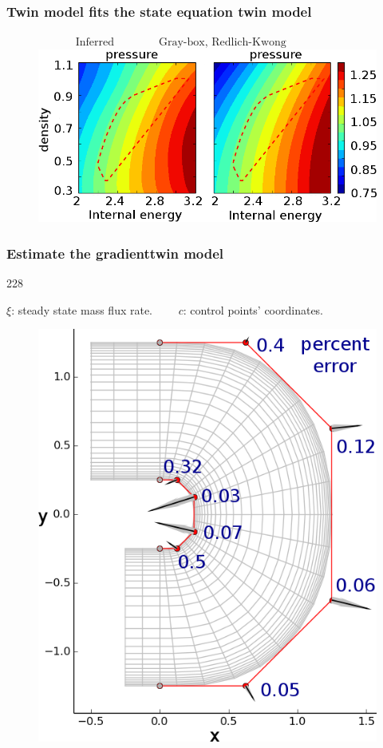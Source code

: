 \documentclass{beamer}
\newcommand{\barrow}{\item[\color{darkred}\ding{228}]}
\begin{document}
\begin{frame}
    \frametitle{Twin model fits the state equation \hfill \scriptsize{twin model}} \small
    \begin{figure}[H]\begin{center}
        \centering $\qquad\quad$ $\textrm{Inferred} \qquad\qquad \textrm{Gray-box, Redlich-Kwong}$
        \includegraphics[width=10.cm]{state_eqn_rk.png}
    \end{center}\end{figure}
\end{frame}

\begin{frame}
    \frametitle{Estimate the gradient\hfill \scriptsize{twin model}} \small
    \begin{dinglist}{228}
        \barrow
        $\xi$: steady state mass flux rate.$\qquad$ $c$: control points' coordinates.
        \begin{figure}\begin{center}
            \includegraphics[width=5.cm]{Ubend_grad_compare.png}
        \end{center}\end{figure}
    \end{dinglist}
\end{frame}
\end{document}
